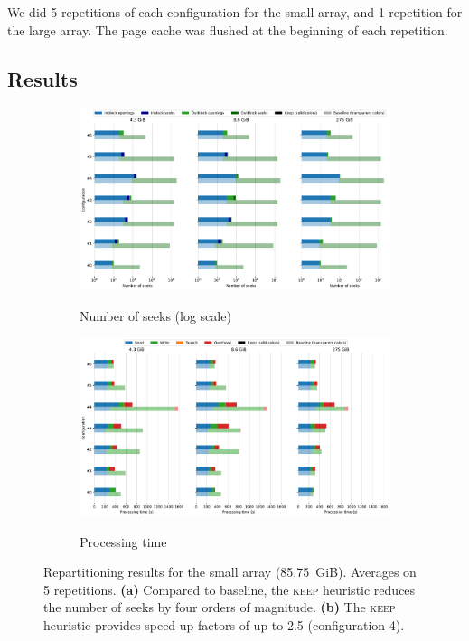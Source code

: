 \documentclass[sigconf, nonacm]{acmart}
\newcommand{\keep}[0]{\textsc{keep}\xspace}
\begin{document}
We did 5 repetitions of each configuration for the small array, and 1
repetition for the large array. The page cache was flushed at the beginning
of each repetition.


\subsection{Results}

\begin{figure}
  \centering
  \begin{subfigure}{\textwidth}
    \caption{Number of seeks (log scale)}
    \includegraphics[width=\textwidth]{./figures/seeks_3500.pdf}
    \label{fig:seeks_3500}
  \end{subfigure}
  \begin{subfigure}{\textwidth}
    \caption{Processing time}
   \includegraphics[width=\textwidth]{./figures/time_3500.pdf}
  \label{fig:time_3500}
  \end{subfigure}
  \caption{Repartitioning results for the small array (85.75~GiB). Averages on 5 repetitions. \textbf{(a)} Compared to baseline, the \keep heuristic
  reduces the number of seeks by four orders of magnitude. \textbf{(b)} The \keep heuristic provides speed-up factors of up to 2.5 (configuration 4).}
  \label{fig:3500}
\end{figure}
\end{document}
